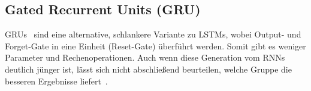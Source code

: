 \subsection*{Gated Recurrent Units (GRU)}

GRUs~\cite{Cho14} sind eine alternative, schlankere Variante zu LSTMs, wobei Output- und Forget-Gate in eine Einheit (Reset-Gate) überführt werden.
Somit gibt es weniger Parameter und Rechenoperationen.
Auch wenn diese Generation vom RNNs deutlich jünger ist, lässt sich nicht abschließend beurteilen, welche Gruppe die besseren Ergebnisse liefert~\cite{Pointer19}.

